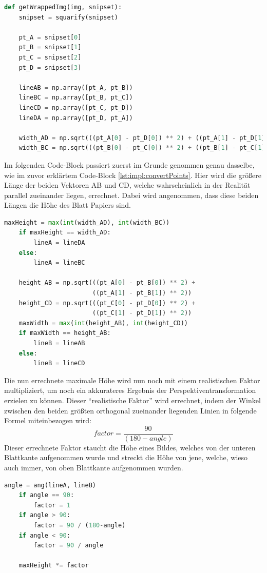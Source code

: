 \begin{lstlisting}[caption=Bild in Vogelperspektive umwandeln,language=Python,label=lst:impl:convertPoints]
def getWrappedImg(img, snipset):
    snipset = squarify(snipset)

    pt_A = snipset[0]
    pt_B = snipset[1]
    pt_C = snipset[2]
    pt_D = snipset[3]

    lineAB = np.array([pt_A, pt_B])
    lineBC = np.array([pt_B, pt_C])
    lineCD = np.array([pt_C, pt_D])
    lineDA = np.array([pt_D, pt_A])

    width_AD = np.sqrt(((pt_A[0] - pt_D[0]) ** 2) + ((pt_A[1] - pt_D[1]) ** 2))
    width_BC = np.sqrt(((pt_B[0] - pt_C[0]) ** 2) + ((pt_B[1] - pt_C[1]) ** 2))
\end{lstlisting}
Im folgenden Code-Block passiert zuerst im Grunde genommen genau dasselbe, wie im zuvor erklärtem Code-Block \ref{lst:impl:convertPoints}. Hier wird die größere Länge der beiden Vektoren AB und CD, welche wahrscheinlich in der Realität parallel zueinander liegen, errechnet. Dabei wird angenommen, dass diese beiden Längen die Höhe des Blatt Papiers sind.
\begin{lstlisting}[language=Python,label=lst:impl:findBiggestLine,firstnumber=16]
    maxHeight = max(int(width_AD), int(width_BC))
    if maxHeight == width_AD:
        lineA = lineDA
    else:
        lineA = lineBC

    height_AB = np.sqrt(((pt_A[0] - pt_B[0]) ** 2) +
                        ((pt_A[1] - pt_B[1]) ** 2))
    height_CD = np.sqrt(((pt_C[0] - pt_D[0]) ** 2) +
                        ((pt_C[1] - pt_D[1]) ** 2))
    maxWidth = max(int(height_AB), int(height_CD))
    if maxWidth == height_AB:
        lineB = lineAB
    else:
        lineB = lineCD
\end{lstlisting}

Die nun errechnete maximale Höhe wird nun noch mit einem realistischen Faktor multipliziert, um noch ein akkurateres Ergebnis der Perspektiventransformation erzielen zu können. Dieser ``realistische Faktor'' wird errechnet, indem der Winkel zwischen den beiden größten orthogonal zueinander liegenden Linien in folgende Formel miteinbezogen wird:
\[ factor
    = \dfrac{90}{(180-angle)}
\]
Dieser errechnete Faktor staucht die Höhe eines Bildes, welches von der unteren Blattkante aufgenommen wurde und streckt die Höhe von jene, welche, wieso auch immer, von oben Blattkante aufgenommen wurden.


\begin{lstlisting}[language=Python,label=lst:impl:angle,firstnumber=31]
    angle = ang(lineA, lineB)
    if angle == 90:
        factor = 1
    if angle > 90:
        factor = 90 / (180-angle)
    if angle < 90:
        factor = 90 / angle

    maxHeight *= factor
\end{lstlisting}

